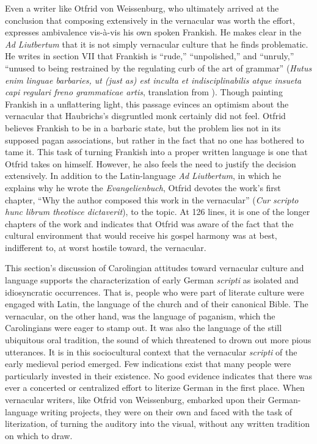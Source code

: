 Even a writer like Otfrid von Weissenburg, who ultimately arrived at the conclusion that composing extensively in the vernacular was worth the effort, expresses ambivalence vis-à-vis his own spoken Frankish. He makes clear in the \textit{Ad Liutbertum} that it is not simply vernacular culture that he finds problematic. He writes in section VII that Frankish is “rude,” “unpolished,” and “unruly,” “unused to being restrained by the regulating curb of the art of grammar” (\textit{Hutus enim linguae barbaries, ut (just as) est inculta et indisciplinabilis atque insueta capi regulari freno grammaticae artis}, translation from \citealt[880]{Magoun1943}). Though painting Frankish in a unflattering light, this passage evinces an optimism about the vernacular that Haubrichs’s disgruntled monk certainly did not feel. Otfrid believes Frankish to be in a barbaric state, but the problem lies not in its supposed pagan associations, but rather in the fact that no one has bothered to tame it. This task of turning Frankish into a proper written language is one that Otfrid takes on himself. However, he also feels the need to justify the decision extensively. In addition to the Latin-language \textit{Ad Liutbertum}, in which he explains why he wrote the \textit{Evangelienbuch}, Otfrid devotes the work’s first chapter, “Why the author composed this work in the vernacular” (\textit{Cur scripto hunc librum theotisce dictaverit}), to the topic. At 126 lines, it is one of the longer chapters of the work and indicates that Otfrid was aware of the fact that the cultural environment that would receive his gospel harmony was at best, indifferent to, at worst hostile toward, the vernacular.

  This section’s discussion of Carolingian attitudes toward vernacular culture and language supports the characterization of early German \textit{scripti} as isolated and idiosyncratic occurrences. That is, people who were part of literate culture were engaged with Latin, the language of the church and of their canonical Bible. The vernacular, on the other hand, was the language of paganism, which the Carolingians were eager to stamp out. It was also the language of the still ubiquitous oral tradition, the sound of which threatened to drown out more pious utterances. It is in this sociocultural context that the vernacular \textit{scripti} of the early medieval period emerged. Few indications exist that many people were particularly invested in their existence. No good evidence indicates that there was ever a concerted or centralized effort to literize German in the first place. When vernacular writers, like Otfrid von Weissenburg, embarked upon their German-language writing projects, they were on their own and faced with the task of literization, of turning the auditory into the visual, without any written tradition on which to draw.

